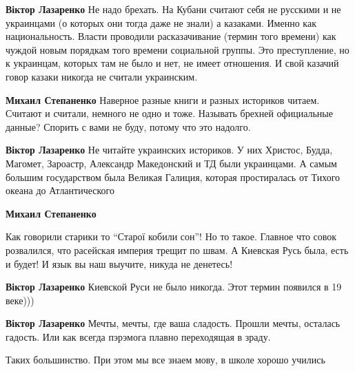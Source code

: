 \begin{itemize}
\begin{itemize}
\textbf{Віктор Лазаренко} Не надо брехать. На Кубани считают себя не русскими и не украинцами (о которых они тогда даже не знали) а казаками. Именно как национальность. Власти проводили расказачивание (термин того времени) как чуждой новым порядкам того времени социальной группы. Это преступление, но к украинцам, которых там не было и нет, не имеет отношения. И свой казачий говор казаки никогда не считали украинским.

\textbf{Михаил Степаненко} Наверное разные книги и разных историков читаем. Считают и считали, немного не одно и тоже. Называть брехней официальные данные? Спорить с вами не буду, потому что это надолго.


\textbf{Віктор Лазаренко} Не читайте украинских историков. У них Христос,
Будда, Магомет, Зароастр, Александр Македонский и ТД были украинцами. А самым
большим государством была Великая Галиция, которая простиралась от Тихого
океана до Атлантического

\textbf{Михаил Степаненко} 

Как говорили старики то \enquote{Старої кобили сон}! Но то такое. Главное что совок
розвалился, что расейская империя трещит по швам. А Киевская Русь была, есть и
будет! И язык вы наш выучите, никуда не денетесь!

\textbf{Віктор Лазаренко} Киевской Руси не было никогда. Этот термин появился в 19 веке)))

\textbf{Віктор Лазаренко} Мечты, мечты, где ваша сладость. Прошли мечты,
осталась гадость. Или как всегда пэрэмога плавно переходящая в зраду.

\end{itemize}

Таких большинство. При этом мы все знаем мову, в школе хорошо учились


\end{itemize}
